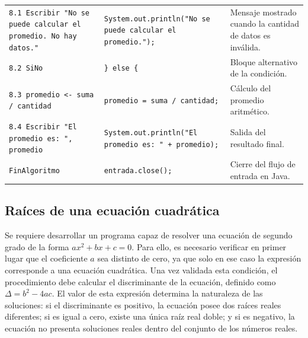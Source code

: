 \documentclass[12pt,twoside]{book}
\begin{document}
\begin{landscape}
\begin{longtable}{p{6cm} p{6cm} p{7.5cm}}
							
							\texttt{8.1 Escribir "No se puede calcular el promedio. No hay datos."}
							&
							\texttt{System.out.println("No se puede calcular el promedio.");}
							&
							Mensaje mostrado cuando la cantidad de datos es inválida. \\
							
							
							\texttt{8.2 SiNo}
							&
							\texttt{\} else \{}
							&
							Bloque alternativo de la condición. \\
							
							
							\texttt{8.3 promedio <- suma / cantidad}
							&
							\texttt{promedio = suma / cantidad;}
							&
							Cálculo del promedio aritmético. \\
							
							
							\texttt{8.4 Escribir "El promedio es: ", promedio}
							&
							\texttt{System.out.println("El promedio es: " + promedio);}
							&
							Salida del resultado final. \\
							
							
							\texttt{FinAlgoritmo}
							&
							\texttt{entrada.close();}
							&
							Cierre del flujo de entrada en Java. \\
							
							
						\end{longtable}
						
					\end{landscape}

				\subsection{Raíces de una ecuación cuadrática}
				\noindent
					Se requiere desarrollar un programa capaz de resolver una ecuación de segundo grado de la forma \(ax^{2}+bx+c=0\). Para ello, es necesario verificar en primer lugar que el coeficiente \(a\) sea distinto de cero, ya que solo en ese caso la expresión corresponde a una ecuación cuadrática. Una vez validada esta condición, el procedimiento debe calcular el discriminante de la ecuación, definido como \( \Delta = b^{2}-4ac \). El valor de esta expresión determina la naturaleza de las soluciones: si el discriminante es positivo, la ecuación posee dos raíces reales diferentes; si es igual a cero, existe una única raíz real doble; y si es negativo, la ecuación no presenta soluciones reales dentro del conjunto de los números reales.
					
\end{document}
